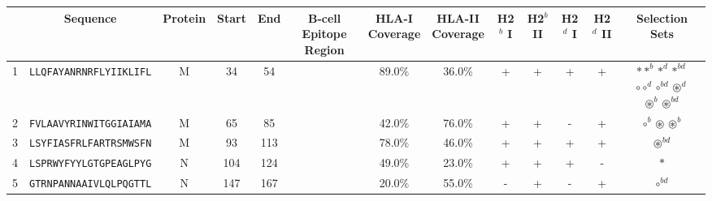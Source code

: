 \begin{tabular}{rcccccccccccc}
\toprule
{} &                        Sequence & Protein &  Start &   End &                                            B-cell Epitope Region & \Centerstack{HLA-I \\ Coverage} & \Centerstack{HLA-II \\ Coverage} & H2$^{b}$ I & H2$^{b}$ II & H2$^{d}$ I & H2$^{d}$ II &                                                                                                                     Selection Sets \\
\midrule
1  &  \texttt{LLQFAYANRNRFLYIIKLIFL} &       M &     34 &    54 &                                                                  &                          89.0\% &                           36.0\% &          + &           + &          + &           + &  \Centerstack{  $\ast \ast^b \ast^d \ast^{bd}$ \\  $\circ \circ^d \circ^{bd} \circledast^d$ \\  $\circledast^b \circledast^{bd}$ } \\
2  &  \texttt{FVLAAVYRINWITGGIAIAMA} &       M &     65 &    85 &                                                                  &                          42.0\% &                           76.0\% &          + &           + &          - &           + &                                                                                              $ \circ^b \circledast \circledast^b $ \\
3  &  \texttt{LSYFIASFRLFARTRSMWSFN} &       M &     93 &   113 &                                                                  &                          78.0\% &                           46.0\% &          + &           + &          + &           + &                                                                                                               $ \circledast^{bd} $ \\
4  &  \texttt{LSPRWYFYYLGTGPEAGLPYG} &       N &    104 &   124 &                                                                  &                          49.0\% &                           23.0\% &          + &           + &          + &           - &                                                                                                                           $ \ast $ \\
5  &  \texttt{GTRNPANNAAIVLQLPQGTTL} &       N &    147 &   167 &                                                                  &                          20.0\% &                           55.0\% &          - &           + &          - &           + &                                                                                                                     $ \circ^{bd} $ \\

\end{tabular}
